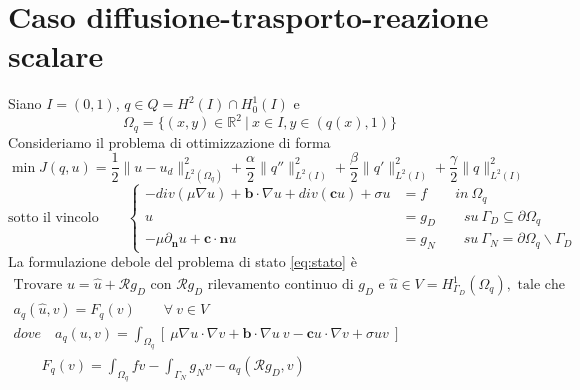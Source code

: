 \documentclass[a4paper,11pt]{article}
\theoremstyle{remark}
\begin{document}
\section{Caso diffusione-trasporto-reazione scalare}

Siano $I=(0,1)$, $q\in Q=H^2(I)\cap H^1_0(I)$ e
\begin{equation*}
 \Omega_q=\{(x,y)\in \mathds{R}^2\ |\ x\in I, y\in(q(x),1)\}
\end{equation*}
Consideriamo il problema di ottimizzazione di forma%
\begin{equation}
 \min J(q,u)=\frac{1}{2}\|u-u_d\|^2_{L^2(\Omega_q)}+\frac{\alpha}{2}\|q''\|^2_{L^2(I)}+\frac{\beta}{2}\|q'\|^2_{L^2(I)}+\frac{\gamma}{2}\|q\|^2_{L^2(I)}
 \label{eq:minJ}
\end{equation}
\begin{equation}
\text{sotto il vincolo}\qquad\left\{
\begin{aligned}
 -div \left(\mu \nabla u\right) + \mathbf{b}\cdot\nabla u + div (\mathbf{c}u)+\sigma u &= f \qquad in\ \Omega_q\\
u&=g_D\qquad su\ \Gamma_D \subseteq \partial\Omega_q\\
 -\mu\partial_\mathbf{n}u + \mathbf{c}\cdot\mathbf{n}u &= g_N\qquad su\ \Gamma_N=\partial\Omega_q \backslash \Gamma_D
\end{aligned}
\right.
\label{eq:stato}
\end{equation}
La formulazione debole del problema di stato \eqref{eq:stato} \`e
\begin{equation}
	\begin{aligned}
\text{Trovare } u = \hat{u}+\mathcal{R}g_D \text{ con } \mathcal{R}g_D \text{ rilevamento continuo di } g_D \text{ e } \hat{u}\in V=H^1_{\Gamma_D}(\Omega_q), \text{ tale che } \\
	 a_q(\hat{u},v)=F_q(v)\qquad\forall\ v\in V\\
	dove\quad a_q(u,v)=\int_{\Omega_q}{\left[\ \mu\nabla u\cdot\nabla v + \mathbf{b}\cdot\nabla u\ v-\mathbf{c} u \cdot\nabla v+\sigma u v\ \right]}\\
	\qquad F_q(v) = \int_{\Omega_q}{f v}-\int_{\Gamma_N} {g_N v}-a_q(\mathcal{R}g_D,v)
	\end{aligned}
\label{eq:statodeb}
\end{equation}
\end{document}
